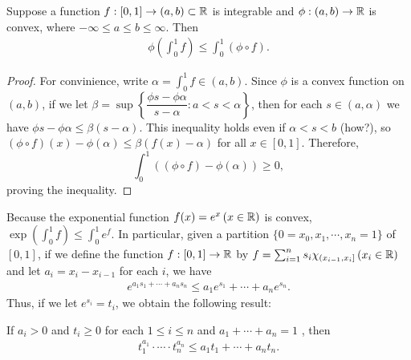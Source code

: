 \begin{prop}
    Suppose a function $f: [0, 1]\rightarrow(a, b)\subset{\mathbb{R}}$ is integrable and $\phi: (a, b)\rightarrow{\mathbb{R}}$ is convex, where $-\infty\leq a\leq b\leq\infty$.
    Then
    \begin{align*}
        \phi\left(\int_0^1 f\right)\leq\int_0^1(\phi\circ f).
    \end{align*}
\end{prop}
\begin{proof}
    For convinience, write $\alpha=\int_0^1 f\in(a, b)$.
    Since $\phi$ is a convex function on $(a, b)$, if we let $\beta=\sup\left\{\dfrac{\phi s-\phi\alpha}{s-\alpha}:a<s<\alpha\right\}$, then for each $s\in(a, \alpha)$ we have $\phi s-\phi\alpha\leq\beta(s-\alpha)$.
    This inequality holds even if $\alpha<s<b$ (how?), so $(\phi\circ f)(x)-\phi(\alpha)\leq\beta(f(x)-\alpha)$ for all $x\in[0, 1]$.
    Therefore,
    \begin{equation*}
        \int_0^1((\phi\circ f)-\phi(\alpha))\geq 0,
    \end{equation*}
    proving the inequality.
\end{proof}
\begin{obs}
    Because the exponential function $f(x)=e^x\,(x\in{\mathbb{R}})$ is convex, $\exp(\int_0^1 f)\leq\int_0^1 e^f$.
    In particular, given a partition $\{0=x_0, x_1, \cdots, x_n=1\}$ of $[0, 1]$, if we define the function $f: [0, 1]\rightarrow{\mathbb{R}}$ by $f=\sum_{i=1}^n s_i\chi_{(x_{i-1}, x_i]}\, (x_i\in{\mathbb{R}})$ and let $a_i=x_i-x_{i-1}$ for each $i$, we have
    \begin{align*}
        e^{a_1s_1+\cdots+a_ns_n}\leq a_1e^{s_1}+\cdots+a_ne^{s_n}.
    \end{align*}
    Thus, if we let $e^{s_i}=t_i$, we obtain the following result:
    \begin{center}
        If $a_i>0$ and $t_i\geq 0$ for each $1\leq i\leq n$ and $a_1+\cdots+a_n=1$ , then
        \begin{align*}
            t_1^{a_1}\cdot\cdots\cdot t_n^{a_n}\leq a_1t_1+\cdots+a_nt_n.
        \end{align*}
    \end{center}
\end{obs}

